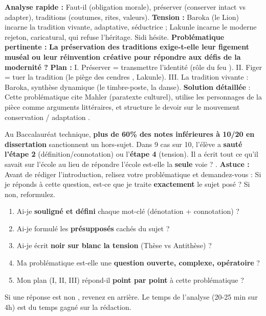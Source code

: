 \documentclass[11pt]{article}
\begin{document}
\begin{exoresolu}
\textbf{Analyse rapide :} \og Faut-il \fg{} (obligation morale), \og préserver \fg{} (conserver intact vs adapter), \og traditions \fg{} (coutumes, rites, valeurs).
\textbf{Tension :} Baroka (le Lion) incarne la tradition vivante, adaptative, séductrice ; Lakunle incarne le moderne rejeton, caricatural, qui refuse l'héritage. Sidi hésite.
\textbf{Problématique pertinente :}
\og \textbf{La préservation des traditions exige-t-elle leur figement muséal ou leur réinvention créative pour répondre aux défis de la modernité ?} \fg{}
\textbf{Plan :} I. Préserver = transmettre l'identité (rôle du \og feu \fg{}). II. Figer = tuer la tradition (le piège des \og cendres \fg{}, Lakunle). III. La tradition vivante : Baroka, synthèse dynamique (le timbre-poste, la danse).
\tcblower
\textbf{Solution détaillée} : Cette problématique cite Mahler (paratexte culturel), utilise les personnages de la pièce comme arguments littéraires, et structure le devoir sur le mouvement \og conservation / adaptation \fg{}.
\end{exoresolu}

\begin{savaistu}
Au Baccalauréat technique, \textbf{plus de 60\% des notes inférieures à 10/20 en dissertation} sanctionnent un hors-sujet. Dans 9 cas sur 10, l'élève a \textbf{sauté l'étape 2} (définition/connotation) ou l'\textbf{étape 4} (tension). Il a écrit \og tout ce qu'il savait sur l'école \fg{} au lieu de répondre \og l'école est-elle la \textbf{seule} voie ? \fg{}. \textbf{Astuce :} Avant de rédiger l'introduction, relisez votre problématique et demandez-vous : \og Si je réponds à cette question, est-ce que je traite \textbf{exactement} le sujet posé ? \fg{} Si non, reformulez.
\end{savaistu}

\begin{aretenir}
\begin{enumerate}
    \item Ai-je \textbf{souligné et défini} chaque mot-clé (dénotation + connotation) ?
    \item Ai-je formulé les \textbf{présupposés} cachés du sujet ?
    \item Ai-je écrit \textbf{noir sur blanc la tension} (Thèse vs Antithèse) ?
    \item Ma problématique est-elle une \textbf{question ouverte, complexe, opératoire} ?
    \item Mon plan (I, II, III) répond-il \textbf{point par point} à cette problématique ?
\end{enumerate}
Si une réponse est \og non \fg{}, revenez en arrière. Le temps de l'analyse (20-25 min sur 4h) est du temps gagné sur la rédaction.
\end{aretenir}
\end{document}
